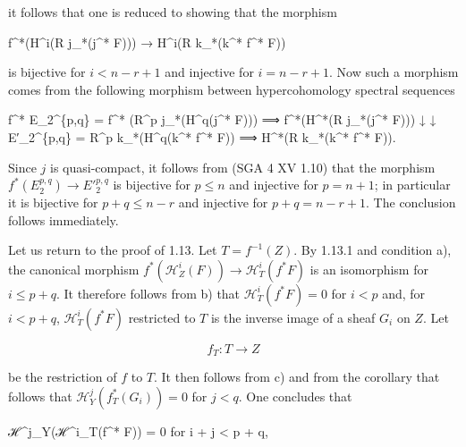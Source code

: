 \documentclass[
]{article}
\newenvironment{Shaded}{}{}
\newcommand{\NormalTok}[1]{#1}
\begin{document}
it follows that one is reduced to showing that the morphism

\begin{Shaded}
\begin{Highlighting}[]
\NormalTok{f\^{}*(H\^{}i(R j\_*(j\^{}* F))) → H\^{}i(R k\_*(k\^{}* f\^{}* F))}
\end{Highlighting}
\end{Shaded}

is bijective for \(i < n - r + 1\) and injective for \(i = n - r + 1\).
Now such a morphism comes from the following morphism between
hypercohomology spectral sequences

\begin{Shaded}
\begin{Highlighting}[]
\NormalTok{f\^{}* E\_2\^{}\{p,q\} = f\^{}* (R\^{}p j\_*(H\^{}q(j\^{}* F)))     ⟹ f\^{}*(H\^{}*(R j\_*(j\^{}* F)))}
\NormalTok{       ↓                                         ↓}
\NormalTok{E′\_2\^{}\{p,q\} = R\^{}p k\_*(H\^{}q(k\^{}* f\^{}* F))           ⟹ H\^{}*(R k\_*(k\^{}* f\^{}* F)).}
\end{Highlighting}
\end{Shaded}

Since \(j\) is quasi-compact, it follows from (SGA 4 XV 1.10) that the
morphism \(f^{*}(E^{p,q}_{2}) \to E'^{p,q}_{2}\) is bijective for
\(p \leqslant n\) and injective for \(p = n + 1\); in particular it is
bijective for \(p + q \leqslant n - r\) and injective for
\(p + q = n - r + 1\). The conclusion follows immediately.

Let us return to the proof of 1.13. Let \(T = f^{-1}(Z)\). By 1.13.1 and
condition a), the canonical morphism
\(f^{*}(\mathcal{H}^{i}_{Z}(F)) \to \mathcal{H}^{i}_{T}(f^{*} F)\) is an
isomorphism for \(i \leqslant p + q\). It therefore follows from b) that
\(\mathcal{H}^{i}_{T}(f^{*} F) = 0\) for \(i < p\) and, for
\(i < p + q\), \(\mathcal{H}^{i}_{T}(f^{*} F)\) restricted to \(T\) is
the inverse image of a sheaf \(G_{i}\) on \(Z\). Let

\[
f_{T} : T \to Z
\]

be the restriction of \(f\) to \(T\). It then follows from c) and from
the corollary that follows that
\(\mathcal{H}^{j}_{Y}(f^{*}_{T}(G_{i})) = 0\) for \(j < q\). One
concludes that

\begin{Shaded}
\begin{Highlighting}[]
\NormalTok{ℋ\^{}j\_Y(ℋ\^{}i\_T(f\^{}* F)) = 0 for i + j \textless{} p + q,}
\end{Highlighting}
\end{Shaded}
\end{document}

